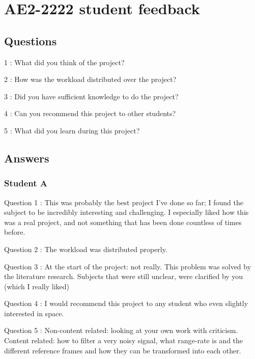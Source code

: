 \documentclass[11pt,a4paper,oneside]{article}
\newcommand{\listskip}{0pt}
\newenvironment{description*}
{\begin{description}
  \setlength{\itemsep}{\listskip}
  \setlength{\parskip}{\listskip}
  \setlength{\parsep}{\listskip}}
{\end{description}}
\begin{document}


\appendix

\newpage
\section{AE2-2222 student feedback} \label{sec:appendixA}

\subsection{Questions}

\begin{description*}
\item[1]: What did you think of the project?
\item[2]: How was the workload distributed over the project?
\item[3]: Did you have sufficient knowledge to do the project?
\item[4]: Can you recommend this project to other students?
\item[5]: What did you learn during this project?
\end{description*}

\subsection{Answers}


\subsubsection{Student A}

\begin{description*}
\item[Question 1]: This was probably the best project I've done so far; I found the subject to be incredibly interesting and challenging. I especially liked how this was a real project, and not something that has been done countless of times before.
\item[Question 2]: The workload was distributed properly.
\item[Question 3]: At the start of the project: not really. This problem was solved by the literature research. Subjects that were still unclear, were clarified by you (which I really liked)
\item[Question 4]: I would recommend this project to any student who even slightly interested in space.
\item[Question 5]: Non-content related: looking at your own work with criticism. Content related: how to filter a very noisy signal, what range-rate is and the different reference frames and how they can be transformed into each other.
\end{description*}
\end{document}
